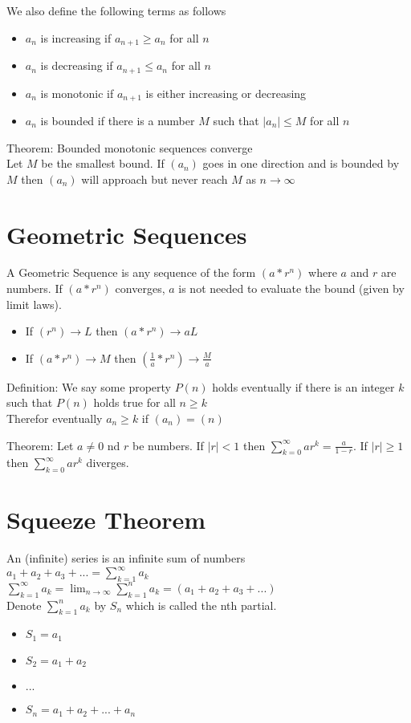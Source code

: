 \documentclass{article}
\begin{document}
We also define the following terms as follows
\begin{itemize}
  \item $a_n$ is increasing if $a_{n+1} \geq a_n$ for all $n$
  \item $a_n$ is decreasing if $a_{n+1} \leq a_n$ for all $n$
  \item $a_n$ is monotonic if $a_{n+1}$ is either increasing or decreasing
  \item $a_n$ is bounded if there is a number $M$ such that $|a_n| \leq M$ for all $n$
\end{itemize}

Theorem: Bounded monotonic sequences converge\\
Let $M$ be the smallest bound. If $(a_n)$ goes in one direction and is bounded by $M$ then $(a_n)$ will approach but never reach $M$ as $n \to \infty$

\section{Geometric Sequences}
A Geometric Sequence is any sequence of the form $(a * r^n)$ where $a$ and $r$ are numbers. If $(a * r^n)$ converges, $a$ is not needed to evaluate the bound (given by limit laws).
\begin{itemize}
  \item If $(r^n) \to L$ then $(a * r^n) \to aL$
  \item If $(a* r^n) \to M$ then $(\frac{1}{a} * r^n) \to \frac{M}{a}$
\end{itemize}

Definition: We say some property $P(n)$ holds eventually if there is an integer $k$ such that $P(n)$ holds true for all $n \geq k$\\
Therefor eventually $a_n \geq k$ if $(a_n) = (n)$

Theorem: Let $a \neq 0$ nd $r$ be numbers. If $|r| < 1$ then $\sum_{k = 0}^{\infty} ar^k = \frac{a}{1-r}$. If $|r| \geq 1$ then $\sum_{k = 0}^{\infty} ar^k$ diverges.

\section{Squeeze Theorem}
An (infinite) series is an infinite sum of numbers\\
$a_1 + a_2 + a_3 + ... = \sum_{k=1}^{\infty} a_k$\\
$\sum_{k=1}^{\infty} a_k = \lim_{n \to \infty}\sum_{k=1}^{n} a_k = (a_1 + a_2 + a_3 + ...)$\\
Denote $\sum_{k=1}^{n} a_k$ by $S_n$ which is called the nth partial.
\begin{itemize}
  \item $S_1 = a_1$
  \item $S_2 = a_1 + a_2$
  \item $...$
  \item $S_n = a_1 + a_2 + ... + a_n$
\end{itemize}
\end{document}
